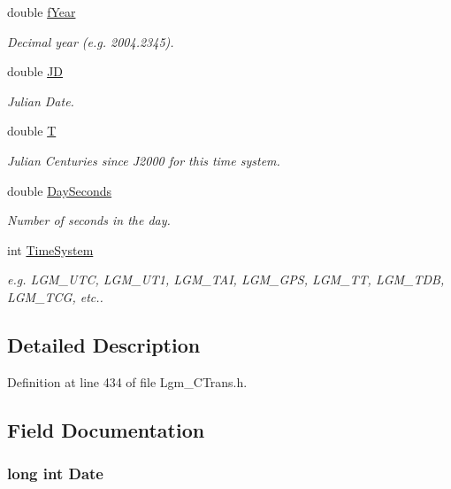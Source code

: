 \begin{CompactItemize}
double \hyperlink{struct_lgm___date_time_808a323a95585d70c244f1e742061ae4}{fYear}
\begin{CompactList}\small\item\em Decimal year (e.g. 2004.2345). \item\end{CompactList}\item 
double \hyperlink{struct_lgm___date_time_fca64005cd84fa9e811dac5219a618ad}{JD}
\begin{CompactList}\small\item\em Julian Date. \item\end{CompactList}\item 
double \hyperlink{struct_lgm___date_time_c94a6e5794c2d7b59588b14025cfba20}{T}
\begin{CompactList}\small\item\em Julian Centuries since J2000 for this time system. \item\end{CompactList}\item 
double \hyperlink{struct_lgm___date_time_4d93ea1d3c17e97bcb29061f1b349a2d}{DaySeconds}
\begin{CompactList}\small\item\em Number of seconds in the day. \item\end{CompactList}\item 
int \hyperlink{struct_lgm___date_time_1d23811e336d585ee5dd39f311f13f92}{TimeSystem}
\begin{CompactList}\small\item\em e.g. LGM\_\-UTC, LGM\_\-UT1, LGM\_\-TAI, LGM\_\-GPS, LGM\_\-TT, LGM\_\-TDB, LGM\_\-TCG, etc.. \item\end{CompactList}\end{CompactItemize}


\subsection{Detailed Description}


Definition at line 434 of file Lgm\_\-CTrans.h.

\subsection{Field Documentation}
\hypertarget{struct_lgm___date_time_8c1b7b17183e48a6fafaf6302e1b1da9}{
\subsubsection[{Date}]{\setlength{\rightskip}{0pt plus 5cm}long int {\bf Date}}}
\label{struct_lgm___date_time_8c1b7b17183e48a6fafaf6302e1b1da9}


